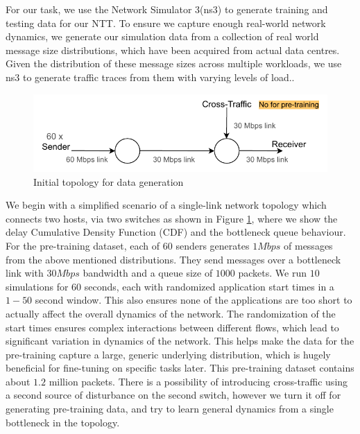 For our task, we use the Network Simulator 3(ns3)\cite{ns3} to generate training and testing data for our NTT. To ensure we capture enough real-world network dynamics, we generate our simulation data from a collection of real world message size distributions, which have been acquired from actual data centres. Given the distribution of these message sizes across multiple workloads, we use ns3 to generate traffic traces from them with varying levels of load.\cite{homa}.

\begin{figure}[h]
  \begin{center}
    \includegraphics[scale=1.2]{figures/simple_topo.pdf}
    \caption{Initial topology for data generation}
    \label{fig:topo}
  \end{center}
\end{figure}

We begin with a simplified scenario of a single-link network topology which connects two hosts, via two switches as shown in Figure \ref{fig:topo}, where we show the delay Cumulative Density Function (CDF) and the bottleneck queue behaviour. For the pre-training dataset, each of $60$ senders generates $1Mbps$ of messages from the above mentioned distributions. They send messages over a bottleneck link with $30Mbps$ bandwidth and a queue size of $1000$ packets. We run $10$ simulations for $60$ seconds, each with randomized application start times in a $1-50$ second window. This also ensures none of the applications are too short to actually affect the overall dynamics of the network. The randomization of the start times ensures complex interactions between different flows, which lead to significant variation in dynamics of the network. This helps make the data for the pre-training capture a large, generic underlying distribution, which is hugely beneficial for fine-tuning on specific tasks later. This pre-training dataset contains about $1.2$ million packets. There is a possibility of introducing cross-traffic using a second source of disturbance on the second switch, however we turn it off for generating pre-training data, and try to learn general dynamics from a single bottleneck in the topology.

